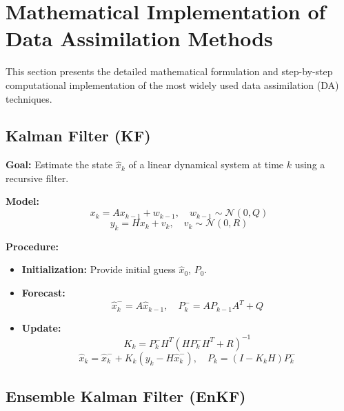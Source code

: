 \documentclass[a4paper]{article}
\begin{document}

\section{Mathematical Implementation of Data Assimilation Methods}

This section presents the detailed mathematical formulation and step-by-step computational implementation of the most widely used data assimilation (DA) techniques.

\subsection{Kalman Filter (KF)}

\textbf{Goal:} Estimate the state $\hat{x}_k$ of a linear dynamical system at time $k$ using a recursive filter.

\textbf{Model:}
\[
x_k = A x_{k-1} + w_{k-1}, \quad w_{k-1} \sim \mathcal{N}(0, Q)
\]
\[
y_k = H x_k + v_k, \quad v_k \sim \mathcal{N}(0, R)
\]

\textbf{Procedure:}
\begin{itemize}
  \item \textbf{Initialization:} Provide initial guess $\hat{x}_0$, $P_0$.
  \item \textbf{Forecast:}
  \[
  \hat{x}_k^{-} = A \hat{x}_{k-1}, \quad P_k^{-} = A P_{k-1} A^T + Q
  \]
  \item \textbf{Update:}
  \[
  K_k = P_k^{-} H^T (H P_k^{-} H^T + R)^{-1}
  \]
  \[
  \hat{x}_k = \hat{x}_k^{-} + K_k (y_k - H \hat{x}_k^{-}), \quad P_k = (I - K_k H) P_k^{-}
  \]
\end{itemize}

\subsection{Ensemble Kalman Filter (EnKF)}
\end{document}

